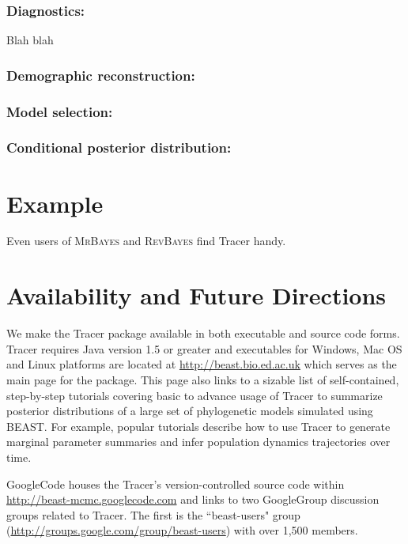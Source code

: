 \documentclass{bioinfo}
\begin{document}
\subsubsection*{Diagnostics:} Blah blah 

\subsubsection*{Demographic reconstruction:} 

\subsubsection*{Model selection:}


\subsubsection*{Conditional posterior distribution:}




\section*{Example}

Even users of \textsc{MrBayes} and \textsc{RevBayes} find Tracer handy.  

\section*{Availability and Future Directions}

We make the Tracer package available in both executable and source code forms.   Tracer requires Java version 1.5 or greater and executables for Windows, Mac OS and Linux platforms are located at \url{http://beast.bio.ed.ac.uk} which serves as the main page for the package. This page also links to a sizable list of self-contained, step-by-step tutorials covering basic to advance usage of Tracer to summarize posterior distributions of a large set of phylogenetic models simulated using BEAST.  For example, popular tutorials describe how to use Tracer to generate marginal parameter summaries and infer population dynamics trajectories over time.

GoogleCode houses the Tracer's version-controlled source code within \url{http://beast-mcmc.googlecode.com} and links to two GoogleGroup discussion groups related to Tracer.  
The first is the ``beast-users" group (\url{http://groups.google.com/group/beast-users}) with over 1,500 members. 
\end{document}
